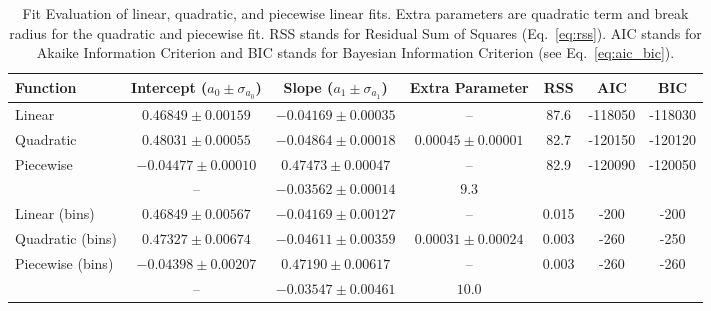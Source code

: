 
\begin{table*}
\caption{
Fit Evaluation of linear, quadratic, and piecewise linear fits.
Extra parameters are quadratic term and break radius for the quadratic and piecewise fit.
RSS stands for Residual Sum of Squares (Eq.~\ref{eq:rss}).
AIC stands for Akaike Information Criterion and BIC stands for Bayesian Information Criterion (see Eq.~\ref{eq:aic_bic}).
}
\label{tab:global_fit_results_comparison}
\begin{tabularx}{\textwidth}{lCCCccc}
\hline
Function & Intercept ($a_0 \pm \sigma_{a_0}$) & Slope ($a_1 \pm \sigma_{a_1}$) & Extra Parameter & RSS & AIC & BIC \\
\hline
Linear & $0.46849 \pm 0.00159$  & $-0.04169 \pm 0.00035$ & -- & 87.6 & -118050  & -118030 \\ 
Quadratic & $0.48031 \pm 0.00055$  & $-0.04864 \pm 0.00018$ & $0.00045 \pm 0.00001$ & 82.7 & -120150  & -120120 \\ 
Piecewise & $-0.04477 \pm 0.00010$ & $0.47473 \pm 0.00047$ & -- & 82.9 & -120090  & -120050 \\ 
 & -- & $-0.03562 \pm 0.00014$ & $9.3$ & & & \\ 
\hline
Linear (bins)& $0.46849 \pm 0.00567$  & $-0.04169 \pm 0.00127$ & -- & 0.015 & -200  & -200 \\ 
Quadratic (bins) & $0.47327 \pm 0.00674$  & $-0.04611 \pm 0.00359$ & $0.00031 \pm 0.00024$ & 0.003 & -260  & -250 \\ 
Piecewise (bins) & $-0.04398 \pm 0.00207$ & $0.47190 \pm 0.00617$ & -- & 0.003 & -260  & -260 \\ 
 & -- & $-0.03547 \pm 0.00461$ & $10.0$ & & & \\ 
\hline
\end{tabularx}
\end{table*}
